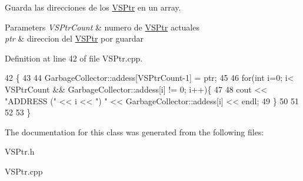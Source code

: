 Guarda las direcciones de los \hyperlink{classVSPtr}{V\+S\+Ptr} en un array. 


\begin{DoxyParams}{Parameters}
{\em V\+S\+Ptr\+Count} & numero de \hyperlink{classVSPtr}{V\+S\+Ptr} actuales \\
\hline
{\em ptr} & direccion del \hyperlink{classVSPtr}{V\+S\+Ptr} por guardar \\
\hline
\end{DoxyParams}


Definition at line 42 of file V\+S\+Ptr.\+cpp.


\begin{DoxyCode}
42                                                             \{
43 
44     GarbageCollector::addess[VSPtrCount-1] = ptr;
45 
46     \textcolor{keywordflow}{for}(\textcolor{keywordtype}{int} i=0; i< VSPtrCount && GarbageCollector::addess[i] != 0; i++)\{
47 
48         cout << \textcolor{stringliteral}{"ADDRESS ("} << i << \textcolor{stringliteral}{") "} << GarbageCollector::addess[i] << endl;
49     \}
50     
51 
52     
53 \}
\end{DoxyCode}


The documentation for this class was generated from the following files\+:\begin{DoxyCompactItemize}
\item 
V\+S\+Ptr.\+h\item 
V\+S\+Ptr.\+cpp\end{DoxyCompactItemize}
